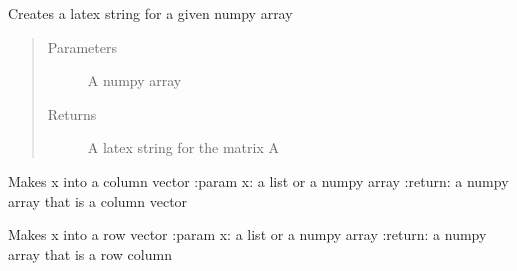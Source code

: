 \documentclass[letterpaper,10pt,english]{sphinxmanual}
\begin{document}
\begin{fulllineitems}
\label{\detokenize{mpo.utils:mpo.utils.general_utils.latex_matrix}}
\sphinxAtStartPar
Creates a latex string for a given numpy array
\begin{quote}\begin{description}
\item[{Parameters}] \leavevmode
\sphinxAtStartPar
{} \textendash{} A numpy array

\item[{Returns}] \leavevmode
\sphinxAtStartPar
A latex string for the matrix A

\end{description}\end{quote}

\end{fulllineitems}


\begin{fulllineitems}
\label{\detokenize{mpo.utils:mpo.utils.general_utils.make_column}}
\sphinxAtStartPar
Makes x into a column vector
:param x: a list or a numpy array
:return: a numpy array that is a column vector

\end{fulllineitems}


\begin{fulllineitems}
\label{\detokenize{mpo.utils:mpo.utils.general_utils.make_row}}
\sphinxAtStartPar
Makes x into a row vector
:param x: a list or a numpy array
:return: a numpy array that is a row column

\end{fulllineitems}
\end{document}
